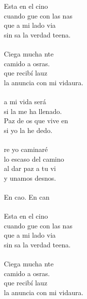\begin{cancion}%
	Esta en el cino \\
	cuando gue con las nas\\
	 que a mi lado via \\
	sin sa la verdad teena.\\
\jump\\
	Ciega mucha nte \\
	camido a osras.\\
	que recibí lauz \\
	la anuncia con mi vidaura.\\
\jump\\
	a mi vida será\\
	si la  me ha llenado. \\
	Paz de os que vive en  \\
	si yo la he dedo.\\
\jump\\
	re yo caminaré \\
	lo escaso del camino\\
	al dar  paz a tu vi \\
	y unamos desnos.\\
\jump\\
	En cao. En can\\
\jump\\
	Esta en el cino \\
	cuando gue con las nas\\
	 que a mi lado via \\
	sin sa la verdad teena.\\
\jump\\
	Ciega mucha nte \\
	camido a osras.\\
	que recibí lauz \\
	la anuncia con mi vidaura.\\

\end{cancion}
